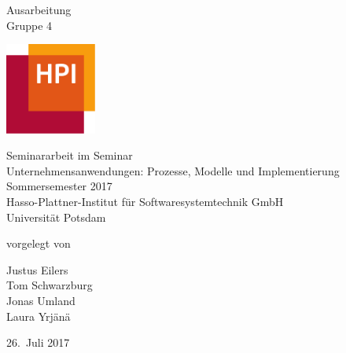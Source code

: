 \documentclass[11pt, a4paper]{article}
\begin{document}
          

\begin{titlepage}
	 
  \begin{center} 
    \mbox{}
    \vspace{1cm}
    
    {\huge Ausarbeitung \\[1em] {\LARGE Gruppe 4}}  
        
    \vspace{10mm}
    \includegraphics[width = 30mm]{images/HPI_logo.png}
    \vspace{10mm}
    
    Seminararbeit im Seminar \\[1em]
    {\large \sc Unternehmensanwendungen: Prozesse, Modelle und Implementierung} \\[1em]
    Sommersemester 2017 \\[1em]
    Hasso-Plattner-Institut für Softwaresystemtechnik GmbH \\[1em]
    Universität Potsdam
    
    \vspace{3cm}
    
		vorgelegt von
		
    \vspace{1em}
    		{\Large Justus Eilers}\\
    		{\Large Tom Schwarzburg}\\
		{\Large Jonas Umland} \\		
		{\Large Laura Yrjänä}\\
		
		
    \vspace{3em}
    
    26.~Juli 2017
  \end{center}
\end{titlepage}


\setcounter{page}{1}



\tableofcontents 

\newpage

 
\newpage

\newpage

\newpage

\newpage



\newpage




\end{document}

